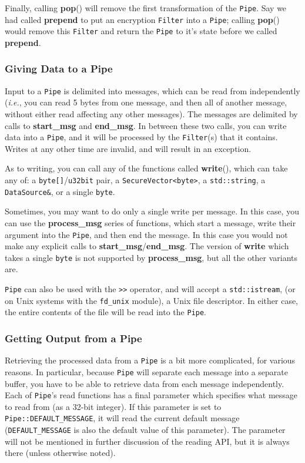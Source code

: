 \documentclass{article}
\newcommand{\function}[1]{\textbf{#1}}
\newcommand{\type}[1]{\texttt{#1}}
\newcommand{\ie}[0]{\emph{i.e.}}
\begin{document}
Finally, calling \function{pop}() will remove the first transformation of the
\type{Pipe}. Say we had called \function{prepend} to put an encryption
\type{Filter} into a \type{Pipe}; calling \function{pop}() would remove this
\type{Filter} and return the \type{Pipe} to it's state before we called
\function{prepend}.

\subsubsection{Giving Data to a Pipe}

Input to a \type{Pipe} is delimited into messages, which can be read from
independently (\ie, you can read 5 bytes from one message, and then all of
another message, without either read affecting any other messages). The
messages are delimited by calls to \function{start\_msg} and
\function{end\_msg}. In between these two calls, you can write data into a
\type{Pipe}, and it will be processed by the \type{Filter}(s) that it
contains. Writes at any other time are invalid, and will result in an
exception.

As to writing, you can call any of the functions called \function{write}(),
which can take any of: a \type{byte[]}/\type{u32bit} pair, a
\type{SecureVector<byte>}, a \type{std::string}, a \type{DataSource\&}, or a
single \type{byte}.

Sometimes, you may want to do only a single write per message. In this case,
you can use the \function{process\_msg} series of functions, which start a
message, write their argument into the \type{Pipe}, and then end the
message. In this case you would not make any explicit calls to
\function{start\_msg}/\function{end\_msg}. The version of \function{write}
which takes a single \type{byte} is not supported by \function{process\_msg},
but all the other variants are.

\type{Pipe} can also be used with the \verb|>>| operator, and will accept a
\type{std::istream}, (or on Unix systems with the \verb|fd_unix| module), a
Unix file descriptor. In either case, the entire contents of the file will be
read into the \type{Pipe}.

\subsubsection{Getting Output from a Pipe}

Retrieving the processed data from a \type{Pipe} is a bit more complicated, for
various reasons. In particular, because \type{Pipe} will separate each message
into a separate buffer, you have to be able to retrieve data from each message
independently. Each of \type{Pipe}'s read functions has a final parameter which
specifies what message to read from (as a 32-bit integer). If this parameter is
set to \type{Pipe::DEFAULT\_MESSAGE}, it will read the current default message
(\type{DEFAULT\_MESSAGE} is also the default value of this parameter). The
parameter will not be mentioned in further discussion of the reading API, but
it is always there (unless otherwise noted).
\end{document}
